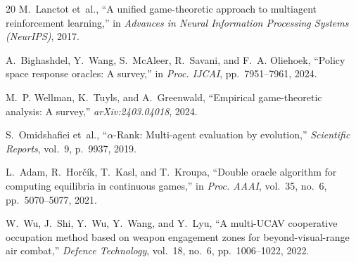 \documentclass[12pt,a4paper]{ctexart}
\begin{document}
\begin{thebibliography}{20}
M.~Lanctot et~al., ``A unified game-theoretic approach to multiagent
reinforcement learning,'' in \emph{Advances in Neural Information
Processing Systems (NeurIPS)}, 2017.

A.~Bighashdel, Y.~Wang, S.~McAleer, R.~Savani, and F.~A. Oliehoek,
``Policy space response oracles: A survey,'' in \emph{Proc. IJCAI},
pp.~7951--7961, 2024.

M.~P. Wellman, K.~Tuyls, and A.~Greenwald, ``Empirical game-theoretic
analysis: A survey,'' \emph{arXiv:2403.04018}, 2024.

S.~Omidshafiei et~al., ``$\alpha$-Rank: Multi-agent evaluation by
evolution,'' \emph{Scientific Reports}, vol.~9, p.~9937, 2019.

L.~Adam, R.~Hor{\v{c}}{\'i}k, T.~Kasl, and T.~Kroupa, ``Double oracle
algorithm for computing equilibria in continuous games,'' in \emph{Proc.
AAAI}, vol.~35, no.~6, pp.~5070--5077, 2021.

W.~Wu, J.~Shi, Y.~Wu, Y.~Wang, and Y.~Lyu, ``A multi-UCAV cooperative
occupation method based on weapon engagement zones for beyond-visual-range
air combat,'' \emph{Defence Technology}, vol.~18, no.~6, pp.~1006--1022,
2022.

\end{thebibliography}
\end{document}
